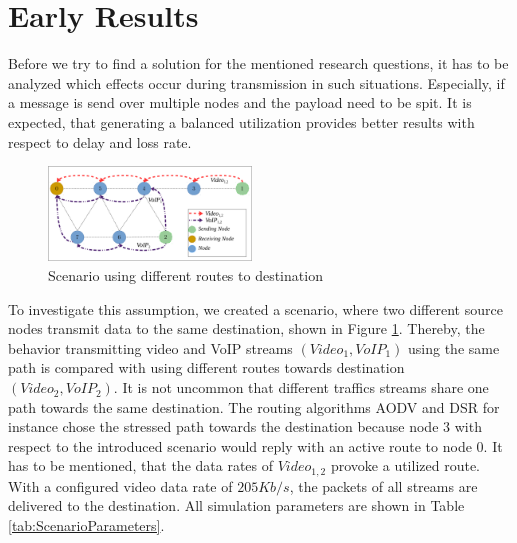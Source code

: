 \documentclass[conference]{IEEEtran}
\newcommand{\VOIP}{VoIP}
\begin{document}
	\section{Early Results}
	Before we try to find a solution for the mentioned research questions, it has to be analyzed which effects occur during transmission in such situations. Especially, if a message is send over multiple nodes and the payload need to be spit. It is expected, that generating a balanced utilization provides better results with respect to delay and loss rate.
	\begin{figure}[h]
		\centering
		\includegraphics[width=0.48\textwidth]{figures/ScenarioBoth.pdf}
		\caption{Scenario using different routes to destination}
		\label{fig:ScenarioBoth}
	\end{figure}
	To investigate this assumption, we created a scenario, where two different source nodes transmit data to the same destination, shown in Figure \ref{fig:ScenarioBoth}.
	Thereby, the behavior transmitting video and \VOIP{} streams $(Video_1,\VOIP{}_1)$ using the same path is compared with using different routes towards destination $(Video_2,\VOIP{}_2)$.
	It is not uncommon that different traffics streams share one path towards the same destination. The routing algorithms AODV \cite{EvaluationAODV} and DSR \cite{Evaluation:DSR} for instance chose the stressed path towards the destination because node $3$ with respect to the introduced scenario would reply with an active route to node $0$. It has to be mentioned, that the data rates of $Video_{1,2}$ provoke a utilized route. With a configured video data rate of $205Kb/s$, the packets of all streams are delivered to the destination. All simulation parameters are shown in Table \ref{tab:ScenarioParameters}.
\end{document}
